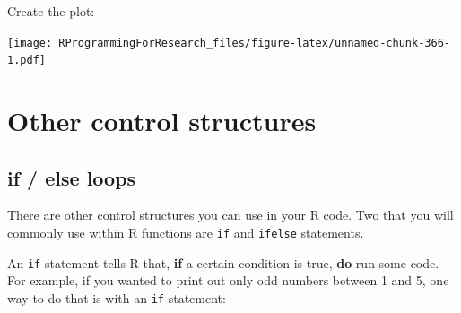\documentclass[]{book}
\makeatletter
\newenvironment{Shaded}{\begin{snugshade}}{\end{snugshade}}
\newcommand{\KeywordTok}[1]{\textcolor[rgb]{0.13,0.29,0.53}{\textbf{{#1}}}}
\newcommand{\DataTypeTok}[1]{\textcolor[rgb]{0.13,0.29,0.53}{{#1}}}
\newcommand{\DecValTok}[1]{\textcolor[rgb]{0.00,0.00,0.81}{{#1}}}
\newcommand{\FloatTok}[1]{\textcolor[rgb]{0.00,0.00,0.81}{{#1}}}
\newcommand{\CharTok}[1]{\textcolor[rgb]{0.31,0.60,0.02}{{#1}}}
\newcommand{\StringTok}[1]{\textcolor[rgb]{0.31,0.60,0.02}{{#1}}}
\newcommand{\NormalTok}[1]{{#1}}
\newenvironment{kframe}{%
\medskip{}
\setlength{\fboxsep}{.8em}
 \def\at@end@of@kframe{}%
 \ifinner\ifhmode%
  \def\at@end@of@kframe{\end{minipage}}%
  \begin{minipage}{\columnwidth}%
 \fi\fi%
 \def\FrameCommand##1{\hskip\@totalleftmargin \hskip-\fboxsep
 \colorbox{shadecolor}{##1}\hskip-\fboxsep
     \hskip-\linewidth \hskip-\@totalleftmargin \hskip\columnwidth}%
 \MakeFramed {\advance\hsize-\width
   \@totalleftmargin\z@ \linewidth\hsize
   \@setminipage}}%
 {\par\unskip\endMakeFramed%
 \at@end@of@kframe}
\renewenvironment{Shaded}{\begin{kframe}}{\end{kframe}}
\makeatother
\begin{document}
Create the plot:

\begin{Shaded}
\end{Shaded}

\texttt{[image: RProgrammingForResearch\_files/figure-latex/unnamed-chunk-366-1.pdf]}

\section{Other control structures}\label{other-control-structures}

\subsection{if / else loops}\label{if-else-loops}

There are other control structures you can use in your R code. Two that
you will commonly use within R functions are \texttt{if} and
\texttt{ifelse} statements. \bigskip

An \texttt{if} statement tells R that, \textbf{if} a certain condition
is true, \textbf{do} run some code. For example, if you wanted to print
out only odd numbers between 1 and 5, one way to do that is with an
\texttt{if} statement:
\end{document}
